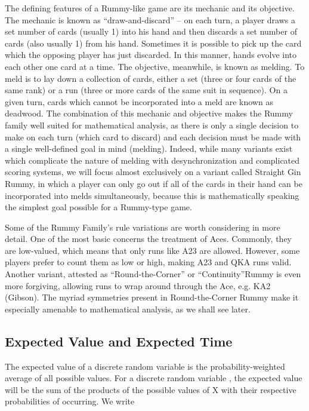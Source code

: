 \documentclass[letter,12pt]{article}
\begin{document}
The defining features of a Rummy-like game are its mechanic and its objective. The mechanic is known as “draw-and-discard” – on each turn, a player draws a set number of cards (usually 1) into his hand and then discards a set number of cards (also usually 1) from his hand. Sometimes it is possible to pick up the card which the opposing player has just discarded. In this manner, hands evolve into each other one card at a time. The objective, meanwhile, is known as melding. To meld is to lay down a collection of cards, either a set (three or four cards of the same rank) or a run (three or more cards of the same suit in sequence). On a given turn, cards which cannot be incorporated into a meld are known as deadwood. The combination of this mechanic and objective makes the Rummy family well suited for mathematical analysis, as there is only a single decision to make on each turn (which card to discard) and each decision must be made with a single well-defined goal in mind (melding). Indeed, while many variants exist which complicate the nature of melding with desynchronization and complicated scoring systems, we will focus almost exclusively on a variant called Straight Gin Rummy, in which a player can only go out if all of the cards in their hand can be incorporated into melds simultaneously, because this is mathematically speaking the simplest goal possible for a Rummy-type game.

Some of the Rummy Family’s rule variations are worth considering in more detail. One of the most basic concerns the treatment of Aces. Commonly, they are low-valued, which means that only runs like A23 are allowed. However, some players prefer to count them as low or high, making A23 and QKA runs valid. Another variant, attested as “Round-the-Corner” or “Continuity”Rummy is even more forgiving, allowing runs to wrap around through the Ace, e.g. KA2 (Gibson). The myriad symmetries present in Round-the-Corner Rummy make it especially amenable to mathematical analysis, as we shall see later. 
 
\subsection{Expected Value and Expected Time}

The expected value of a discrete random variable is the probability-weighted average of all possible values. For a discrete random variable , the expected value will be the sum of the products of the possible values of X with their respective probabilities of occurring. We write\\
\end{document}

